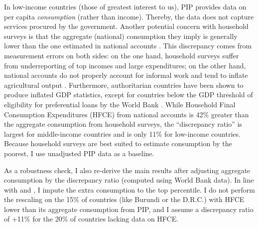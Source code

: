 In low-income countries (those of greatest interest to us), PIP provides data on per capita \textit{consumption} (rather than income). Thereby, the data does not capture services procured by the government. 
Another potential concern with household surveys is that the aggregate (national) consumption they imply is generally lower than the one estimated in national accounts \citep{deaton_measuring_2005,prydz_disparities_2022,hlasny_impact_2022}. This discrepancy comes from measurement errors on both sides: on the one hand, household surveys suffer from underreporting of top incomes and large expenditures; on the other hand, national accounts do not properly account for informal work %
and tend to inflate agricultural output \citep{angrist_why_2021}. 
Furthermore, authoritarian countries have been shown to produce inflated GDP statistics, except for countries below the GDP threshold of eligibility for preferential loans by the World Bank \citep{martinez_how_2022}. %
While Household Final Consumption Expenditures (HFCE) from national accounts is 42\% greater than the aggregate consumption from household surveys, the ``discrepancy ratio'' is largest for middle-income countries and is only 11\% for low-income countries. 
Because household surveys are best suited to estimate consumption by the poorest, I use unadjusted PIP data as a baseline. 

As a robustness check, I also re-derive the main results after adjusting aggregate consumption by the discrepancy ratio (computed using World Bank data). In line with \cite{lakner_global_2013} and \cite{anand_chapter_2015}, I impute the extra consumption to the top percentile. I do not perform the rescaling on the 15\% of countries (like Burundi or the D.R.C.) with HFCE lower than its aggregate consumption from PIP, and I assume a discrepancy ratio of +11\% for the 20\% of countries lacking data on HFCE. 


